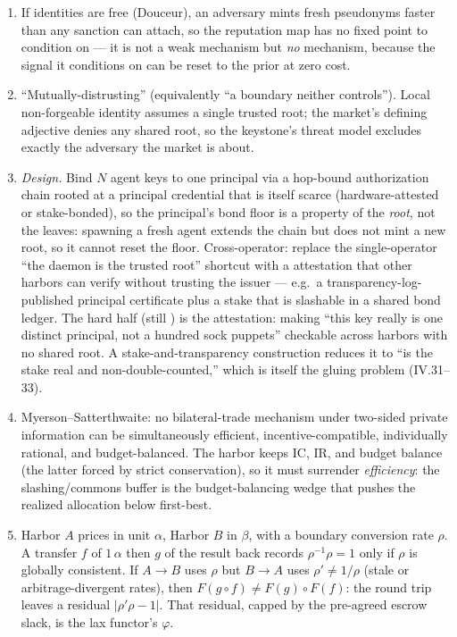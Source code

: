 \begin{enumerate}[label=\textbf{IV.\arabic*},leftmargin=2.8em,itemsep=8pt,topsep=4pt]
\item \wbcheck If identities are free (Douceur), an adversary mints fresh pseudonyms
  faster than any sanction can attach, so the reputation map has no fixed point to
  condition on --- it is not a weak mechanism but \emph{no} mechanism, because the
  signal it conditions on can be reset to the prior at zero cost.

\item \wbcheck ``Mutually-distrusting'' (equivalently ``a boundary neither
  controls''). Local non-forgeable identity assumes a single trusted root; the
  market's defining adjective denies any shared root, so the keystone's threat model
  excludes exactly the adversary the market is about.

\item \wbopen\wbstar \emph{Design.} Bind $N$ agent keys to one principal via a
  hop-bound authorization chain rooted at a principal credential that is itself
  scarce (hardware-attested or stake-bonded), so the principal's bond floor is a
  property of the \emph{root}, not the leaves: spawning a fresh agent extends the
  chain but does not mint a new root, so it cannot reset the floor. Cross-operator:
  replace the single-operator ``the daemon is the trusted root'' shortcut with a
  attestation that other harbors can verify without trusting the issuer --- e.g.\ a
  transparency-log-published principal certificate plus a stake that is slashable in a
  shared bond ledger. The hard half (still \openmark{}) is the attestation: making
  ``this key really is one distinct principal, not a hundred sock puppets'' checkable
  across harbors with no shared root. A stake-and-transparency construction reduces it
  to ``is the stake real and non-double-counted,'' which is itself the gluing problem
  (IV.31--33).

\item \wbcheck Myerson--Satterthwaite: no bilateral-trade mechanism under two-sided
  private information can be simultaneously efficient, incentive-compatible,
  individually rational, and budget-balanced. The harbor keeps IC, IR, and budget
  balance (the latter forced by strict conservation), so it must surrender
  \emph{efficiency}: the slashing/commons buffer is the budget-balancing wedge that
  pushes the realized allocation below first-best.

\item \wbtrace Harbor $A$ prices in unit $\alpha$, Harbor $B$ in $\beta$, with a
  boundary conversion rate $\rho$. A transfer $f$ of $1\,\alpha$ then $g$ of the
  result back records $\rho^{-1}\rho = 1$ only if $\rho$ is globally consistent. If
  $A\to B$ uses $\rho$ but $B\to A$ uses $\rho'\ne 1/\rho$ (stale or
  arbitrage-divergent rates), then $F(g\circ f)\ne F(g)\circ F(f)$: the round trip
  leaves a residual $|\rho'\rho-1|$. That residual, capped by the pre-agreed escrow
  slack, is the lax functor's $\varphi$.


\end{enumerate}

